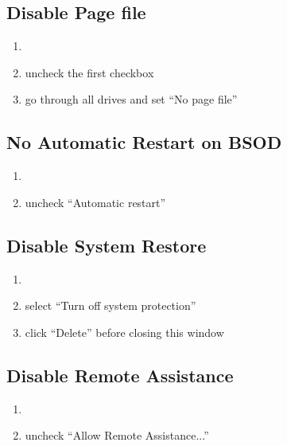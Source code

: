\documentclass{itsarticle}
\begin{document}
\subsection{Disable Page file}
\label{sub:disable_page_file}

\begin{enumerate}
    \item {}
    \item uncheck the first checkbox
    \item go through all drives and set ``No page file''
\end{enumerate}

\subsection{No Automatic Restart on BSOD}
\label{sub:no_automatic_restart_on_bsod}

\begin{enumerate}
    \item {}
    \item uncheck ``Automatic restart''
\end{enumerate}

\subsection{Disable System Restore}
\label{sub:disable_system_restore}

\begin{enumerate}
    \item {}
    \item select ``Turn off system protection''
    \item click ``Delete'' before closing this window
\end{enumerate}

\subsection{Disable Remote Assistance}
\label{sub:disable_remote_assistance}

\begin{enumerate}
    \item {}
    \item uncheck ``Allow Remote Assistance...''
\end{enumerate}
\end{document}
